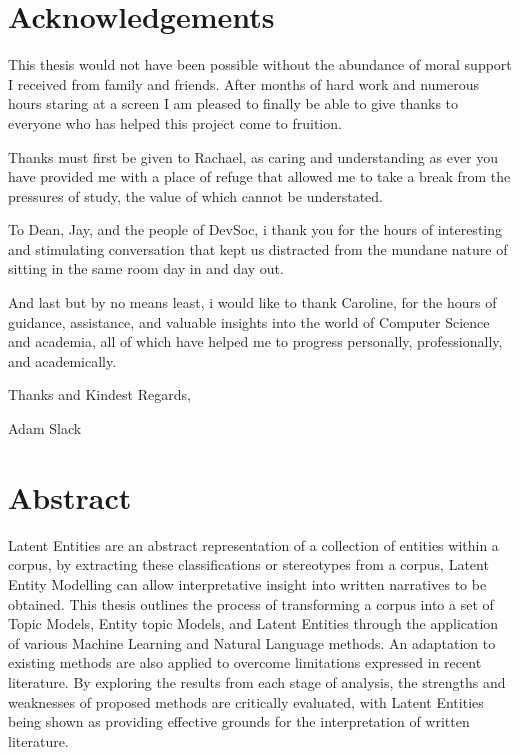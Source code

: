 \documentclass[10pt]{report}
\begin{document}
\section*{Acknowledgements}
\renewcommand{\baselinestretch}{1.5}\normalsize

This thesis would not have been possible without the abundance of moral support I received from family and friends. After months of hard work and numerous hours staring at a screen I am pleased to finally be able to give thanks to everyone who has helped this project come to fruition.

Thanks must first be given to Rachael, as caring and understanding as ever you have provided me with a place of refuge that allowed me to take a break from the pressures of study, the value of which cannot be understated.

To Dean, Jay, and the people of DevSoc, i thank you for the hours of interesting and stimulating conversation that kept us distracted from the mundane nature of sitting in the same room day in and day out.

And last but by no means least, i would like to thank Caroline, for the hours of guidance, assistance, and valuable insights into the world of Computer Science and academia, all of which have helped me to progress personally, professionally, and academically.

\renewcommand{\baselinestretch}{2.0}\normalsize

Thanks and Kindest Regards,

Adam Slack

\renewcommand{\baselinestretch}{1.0}\normalsize

\newpage
{}
\section*{Abstract}

\renewcommand{\baselinestretch}{1.5}\normalsize

Latent Entities are an abstract representation of a collection of entities within a corpus, by extracting these classifications or stereotypes from a corpus, Latent Entity Modelling can allow interpretative insight into written narratives to be obtained. This thesis outlines the process of transforming a corpus into a set of Topic Models, Entity topic Models, and Latent Entities through the application of various Machine Learning and Natural Language methods. An adaptation to existing methods are also applied to overcome limitations expressed in recent literature. By exploring the results from each stage of analysis, the strengths and weaknesses of proposed methods are critically evaluated, with Latent Entities being shown as providing effective grounds for the interpretation of written literature.
\end{document}
